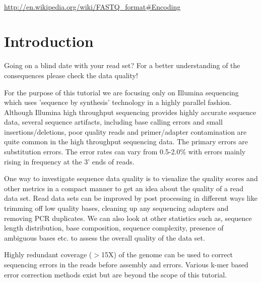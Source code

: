\begin{description}[style=multiline,labelindent=0cm,align=left,leftmargin=0.5cm]
  \item[FASTQ Encoding]\hfill\\
    \url{http://en.wikipedia.org/wiki/FASTQ_format#Encoding}
\end{description}


\newpage

\section{Introduction}

\begin{note}
Going on a blind date with your read set? For a better understanding of the
consequences please check the data quality!
\end{note}

For the purpose of this tutorial we are focusing only on Illumina sequencing
which uses 'sequence by synthesis' technology in a highly parallel fashion.
Although Illumina high throughput  sequencing provides highly accurate sequence
data, several sequence artifacts, including base calling errors and small
insertions/deletions, poor quality reads and primer/adapter contamination are
quite common in the high throughput sequencing data. The primary errors are
substitution errors. The error rates can vary from 0.5-2.0\% with errors mainly
rising in frequency at the 3' ends of reads.

One way to investigate sequence data quality is to visualize the quality scores
and other metrics in a compact manner to get an idea about the quality of a read
data set. Read data sets can be improved by post processing in different ways
like trimming off low quality bases, cleaning up any sequencing adapters and
removing PCR duplicates. We can also look at other statistics such
as, sequence length distribution, base composition, sequence complexity,
presence of ambiguous bases etc. to assess the overall quality of the data set.

Highly redundant coverage ($>$15X) of the genome can be used to correct sequencing
errors in the reads before assembly and errors. Various k-mer based error
correction methods exist but are beyond the scope of this tutorial.

